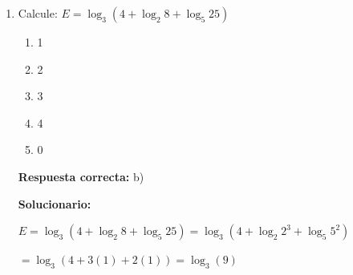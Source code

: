 \begin{enumerate}[resume]
	\vspace{2mm}
	\textbf{Solucionario:}

	$(A + I)^2 - (A - I)^2 = \begin{pmatrix} 4 & -3 \\ 3 & 2 \end{pmatrix} - \begin{pmatrix} -1 & 0 \\ 0 & -1 \end{pmatrix} = \begin{pmatrix} 5 & -3 \\ 3 & 3 \end{pmatrix}$

	$[A + I + A - I][A + I - A + I] = \begin{pmatrix} 5 & -3 \\ 3 & 3 \end{pmatrix}$

	$2A \cdot 2I = \begin{pmatrix} 5 & -3 \\ 3 & 3 \end{pmatrix} \Rightarrow A = \begin{pmatrix} \dfrac{5}{4} & \dfrac{-3}{4} \\\\ \dfrac{3}{4} & \dfrac{3}{4} \end{pmatrix}$

	Traza de $A = \dfrac{5}{4} + \dfrac{3}{4} = $

	\vspace{6mm}

	\item Calcule:
	$E = \log_3(4 + \log_2 8 + \log_5 25)$
	\begin{enumerate}[label=\alph*)]
		\item 1
		\item 2
		\item 3
		\item 4
		\item 0
	\end{enumerate}
	\textbf{Respuesta correcta:} b)

	\vspace{2mm}
	\textbf{Solucionario:}

	$E = \log_3(4 + \log_2 8 + \log_5 25) = \log_3(4 + \log_2 2^3 + \log_5 5^2)$

	$= \log_3(4 + 3(1) + 2(1)) = \log_3(9)$


	\vspace{6mm}
\end{enumerate}



